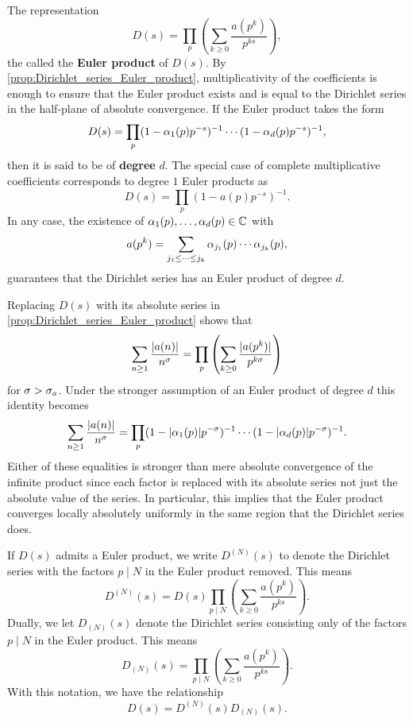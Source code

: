     The representation
    \[
      D(s) = \prod_{p}\left(\sum_{k \ge 0}\frac{a(p^{k})}{p^{ks}}\right),
    \]
    the called the \textbf{Euler product} of \(D(s)\). By \cref{prop:Dirichlet_series_Euler_product}, multiplicativity of the coefficients is enough to ensure that the Euler product exists and is equal to the Dirichlet series in the half-plane of absolute convergence. If the Euler product takes the form
    \[
      D(s) = \prod_{p}(1-\alpha_{1}(p)p^{-s})^{-1} \cdots (1-\alpha_{d}(p)p^{-s})^{-1},
    \]
    then it is said to be of \textbf{degree} \(d\). The special case of complete multiplicative coefficients corresponds to degree \(1\) Euler products as
    \[
      D(s) = \prod_{p}(1-a(p)p^{-s})^{-1}.
    \]
    In any case, the existence of \(\alpha_{1}(p),\ldots,\alpha_{d}(p) \in \mathbb{C}\) with
    \[
      a(p^{k}) = \sum_{j_{1} \le \cdots \le j_{k}}\alpha_{j_{1}}(p) \cdots \alpha_{j_{k}}(p),
    \]
    guarantees that the Dirichlet series has an Euler product of degree \(d\).

    \begin{remark}\label{rem:absolute_Euler_product}
      Replacing \(D(s)\) with its absolute series in \cref{prop:Dirichlet_series_Euler_product} shows that
      \[
        \sum_{n \ge 1}\frac{|a(n)|}{n^{\sigma}} = \prod_{p}\left(\sum_{k \ge 0}\frac{|a(p^{k})|}{p^{k\sigma}}\right)
      \]
      for \(\sigma > \sigma_{a}\). Under the stronger assumption of an Euler product of degree \(d\) this identity becomes
      \[
        \sum_{n \ge 1}\frac{|a(n)|}{n^{\sigma}} = \prod_{p}(1-|\alpha_{1}(p)|p^{-\sigma})^{-1} \cdots (1-|\alpha_{d}(p)|p^{-\sigma})^{-1}.
      \]
      Either of these equalities is stronger than mere absolute convergence of the infinite product since each factor is replaced with its absolute series not just the absolute value of the series. In particular, this implies that the Euler product converges locally absolutely uniformly in the same region that the Dirichlet series does.
    \end{remark}
    
    If \(D(s)\) admits a Euler product, we write \(D^{(N)}(s)\) to denote the Dirichlet series with the factors \(p \mid N\) in the Euler product removed. This means
    \[
      D^{(N)}(s) = D(s)\prod_{p \mid N}\left(\sum_{k \ge 0}\frac{a(p^{k})}{p^{ks}}\right).
    \]
    Dually, we let \(D_{(N)}(s)\) denote the Dirichlet series consisting only of the factors \(p \mid N\) in the Euler product. This means
    \[
      D_{(N)}(s) = \prod_{p \mid N}\left(\sum_{k \ge 0}\frac{a(p^{k})}{p^{ks}}\right).
    \]
    With this notation, we have the relationship
    \[
      D(s) = D^{(N)}(s)D_{(N)}(s).
    \]
